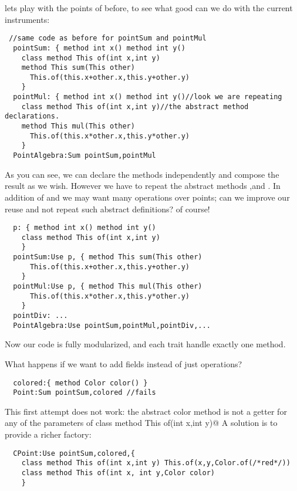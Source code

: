   
  lets play with the points of before, to see what good can we do with the current
  instruments:

\begin{lstlisting}
 //same code as before for pointSum and pointMul
  pointSum: { method int x() method int y()
    class method This of(int x,int y)
    method This sum(This other)
      This.of(this.x+other.x,this.y+other.y)
    }
  pointMul: { method int x() method int y()//look we are repeating
    class method This of(int x,int y)//the abstract method declarations.
    method This mul(This other)
      This.of(this.x*other.x,this.y*other.y)
    }
  PointAlgebra:Sum pointSum,pointMul
\end{lstlisting}  

  As you can see, we can declare the methods independently and compose the result
  as we wish. However we have to repeat the abstract methods \Q@x@,\Q@y@ and \Q@of@.
  In addition of \Q@Sum@ and \Q@Mul@ we may want many operations over points; can we improve our reuse
  and not repeat such abstract definitions? of course!

\begin{lstlisting}
  p: { method int x() method int y()
    class method This of(int x,int y)
    }
  pointSum:Use p, { method This sum(This other)
      This.of(this.x+other.x,this.y+other.y)
    }
  pointMul:Use p, { method This mul(This other)
      This.of(this.x*other.x,this.y*other.y)
    }
  pointDiv: ...
  PointAlgebra:Use pointSum,pointMul,pointDiv,...
\end{lstlisting}
      
Now our code is fully modularized, and each trait handle exactly one method.

What happens if we want to add fields instead of just operations?

\begin{lstlisting}
  colored:{ method Color color() }
  Point:Sum pointSum,colored //fails
\end{lstlisting}

This first attempt does not work: the abstract color method
is not a getter for any of the parameters of 
\Q@ class method This of(int x,int y)@
A solution is to provide a richer factory:

\begin{lstlisting}
  CPoint:Use pointSum,colored,{
    class method This of(int x,int y) This.of(x,y,Color.of(/*red*/))
    class method This of(int x, int y,Color color)
    }
\end{lstlisting}

